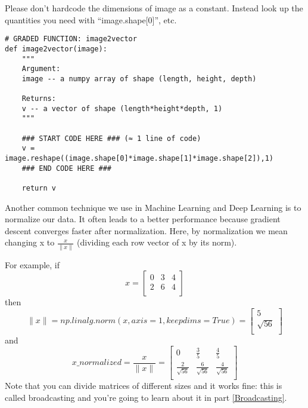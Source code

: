Please don't hardcode the dimensions of image as a constant. Instead look up the quantities you need with ``image.shape[0]'', etc. 

\begin{verbatim}
# GRADED FUNCTION: image2vector
def image2vector(image):
    """
    Argument:
    image -- a numpy array of shape (length, height, depth)
    
    Returns:
    v -- a vector of shape (length*height*depth, 1)
    """
    
    ### START CODE HERE ### (≈ 1 line of code)
    v = image.reshape((image.shape[0]*image.shape[1]*image.shape[2]),1)
    ### END CODE HERE ###
    
    return v
\end{verbatim}



Another common technique we use in Machine Learning and Deep Learning is to normalize our data. It often leads to a better performance because gradient descent converges faster after normalization. Here, by normalization we mean changing x to $ \frac{x}{\| x\|} $ (dividing each row vector of x by its norm).

For example, if 
\begin{equation}
x = 
\begin{bmatrix}
    0 & 3 & 4 \\
    2 & 6 & 4 \\
\end{bmatrix}
\end{equation}
then 
\begin{equation}
\| x\| = np.linalg.norm(x, axis = 1, keepdims = True) = \begin{bmatrix}
    5 \\
    \sqrt{56} \\
\end{bmatrix}
\end{equation}
and
\begin{equation}
x\_normalized = \frac{x}{\| x\|} = \begin{bmatrix}
    0 & \frac{3}{5} & \frac{4}{5} \\
    \frac{2}{\sqrt{56}} & \frac{6}{\sqrt{56}} & \frac{4}{\sqrt{56}} \\
\end{bmatrix}
\end{equation}
Note that you can divide matrices of different sizes and it works fine: this is called broadcasting and you're going to learn about it in part \ref{Broadcasting}.

